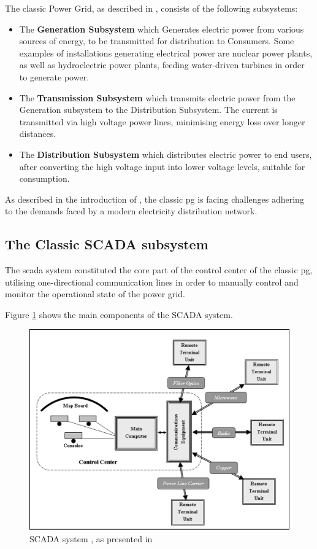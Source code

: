 The classic Power Grid, as described in \cite{BlumeStevenW2007Epsb}, consists of the following subsystems:

\begin{itemize}

 \item The \textbf{Generation Subsystem} which Generates electric power from various sources of energy, to be transmitted for distribution to Consumers. Some examples of installations generating electrical power are nuclear power plants, as well as hydroelectric power plants, feeding water-driven turbines in order to generate power.
 \item The \textbf{Transmission Subsystem} which transmits electric power from the Generation subsystem to the Distribution Subsystem. The current is transmitted via high voltage power lines, minimising energy loss over longer distances.
 \item The \textbf{Distribution Subsystem} which distributes electric power to end users, after converting the high voltage input into lower voltage levels, suitable for consumption.
 \end{itemize}

As described in the introduction of \cite{SmartGridOverview2013}, the classic \acrshort{pg} is facing challenges adhering to the demands faced by a modern electricity distribution network. 


\subsection{The Classic SCADA subsystem}

The \acrshort{scada} system constituted the core part of the control center of the classic \acrlong{pg}, utilising one-directional communication lines in order to manually control and monitor the operational state of the power grid.

Figure \ref{fig:Blume-SCADA-system} shows the main components of the SCADA system.

\begin{figure}[ht]
\includegraphics[width=\linewidth]{figures/Blume-SCADA-system.png}
\caption[SCADA system]{SCADA system , as presented in \cite{BlumeStevenW2007Epsb}}
\label{fig:Blume-SCADA-system}
\end{figure}

